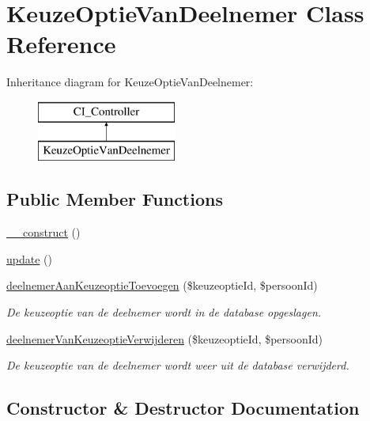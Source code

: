 \hypertarget{class_keuze_optie_van_deelnemer}{}\section{Keuze\+Optie\+Van\+Deelnemer Class Reference}
\label{class_keuze_optie_van_deelnemer}
Inheritance diagram for Keuze\+Optie\+Van\+Deelnemer\+:\begin{figure}[H]
\begin{center}
\leavevmode
\includegraphics[height=2.000000cm]{class_keuze_optie_van_deelnemer}
\end{center}
\end{figure}
\subsection*{Public Member Functions}
\begin{DoxyCompactItemize}
\item 
\mbox{\hyperlink{class_keuze_optie_van_deelnemer_a095c5d389db211932136b53f25f39685}{\+\_\+\+\_\+construct}} ()
\item 
\mbox{\hyperlink{class_keuze_optie_van_deelnemer_a842e4774e3b3601a005b995c02f7e883}{update}} ()
\item 
\mbox{\hyperlink{class_keuze_optie_van_deelnemer_a91e074d113aa641d9ca370800ca92e4b}{deelnemer\+Aan\+Keuzeoptie\+Toevoegen}} (\$keuzeoptie\+Id, \$persoon\+Id)
\begin{DoxyCompactList}\small\item\em De keuzeoptie van de deelnemer wordt in de database opgeslagen. \end{DoxyCompactList}\item 
\mbox{\hyperlink{class_keuze_optie_van_deelnemer_a2bcf529c0ac99ca060c6dba345110341}{deelnemer\+Van\+Keuzeoptie\+Verwijderen}} (\$keuzeoptie\+Id, \$persoon\+Id)
\begin{DoxyCompactList}\small\item\em De keuzeoptie van de deelnemer wordt weer uit de database verwijderd. \end{DoxyCompactList}\end{DoxyCompactItemize}


\subsection{Constructor \& Destructor Documentation}
\mbox{\label{class_keuze_optie_van_deelnemer_a095c5d389db211932136b53f25f39685}} 
